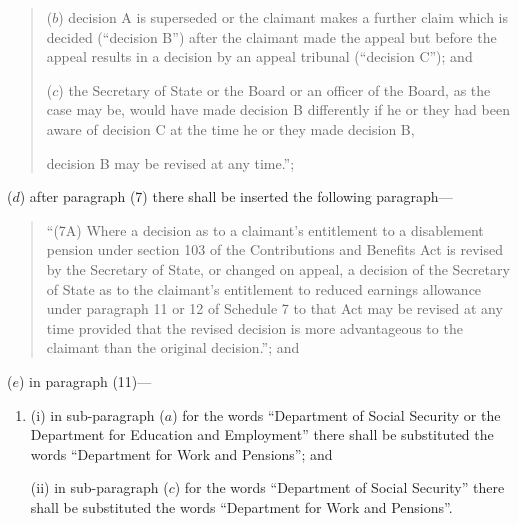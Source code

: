 \documentclass[12pt,a4paper]{article}
\begin{document}
\begin{enumerate}
\begin{quotation}
\begin{enumerate}
($b$) decision A is superseded or the claimant makes a further claim which is decided (“decision B”) after the claimant made the appeal but before the appeal results in a decision by an appeal tribunal (“decision C”); and

($c$) the Secretary of State or the Board or an officer of the Board, as the case may be, would have made decision B differently if he or they had been aware of decision C at the time he or they made decision B,
\end{enumerate}
decision B may be revised at any time.”;
\end{quotation}

($d$) after paragraph (7) there shall be inserted the following paragraph—
\begin{quotation}
“(7A) Where a decision as to a claimant’s entitlement to a disablement pension under section 103 of the Contributions and Benefits Act is revised by the Secretary of State, or changed on appeal, a decision of the Secretary of State as to the claimant’s entitlement to reduced earnings allowance under paragraph 11 or 12 of Schedule 7 to that Act may be revised at any time provided that the revised decision is more advantageous to the claimant than the original decision.”; and
\end{quotation}

($e$) in paragraph (11)—
\begin{enumerate}\item[]
(i) in sub-paragraph ($a$)  for the words “Department of Social Security or the Department for Education and Employment” there shall be substituted the words “Department for Work and Pensions”; and

(ii) in sub-paragraph ($c$)  for the words “Department of Social Security” there shall be substituted the words “Department for Work and Pensions”.
\end{enumerate}
\end{enumerate}

\medskip
\end{document}
